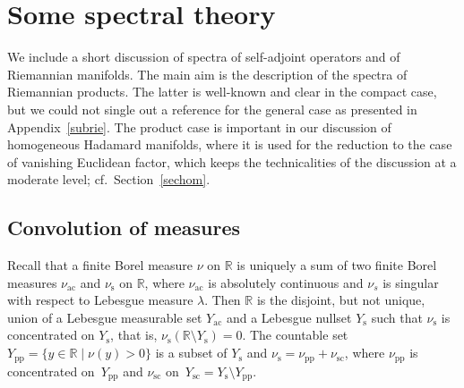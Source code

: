 \documentclass[pdftex]{sigma}
\numberwithin{equation}{section}
\def\p{\mathrm{pp}}
\def\ac{\mathrm{ac}}
\def\sc{\mathrm{sc}}
\def\s{\mathrm s}
\def\R{\mathbb R}
\begin{document}
\appendix

\section{Some spectral theory}\label{secspec}

We include a short discussion of spectra of self-adjoint operators and of Riemannian manifolds.
The main aim is the description of the spectra of Riemannian products.
The latter is well-known and clear in the compact case,
but we could not single out a reference for the general case as presented in Appendix~\ref{subrie}.
The product case is important in our discussion of homogeneous Hadamard manifolds,
where it is used for the reduction to the case of vanishing Euclidean factor,
which keeps the technicalities of the discussion at a moderate level; cf.\ Section~\ref{sechom}.

\subsection{Convolution of measures}%
Recall that a finite Borel measure $\nu$ on $\R$ is uniquely a sum of two finite Borel measures $\nu_{\ac}$ and $\nu_{\s}$ on $\R$,
where $\nu_{\ac}$ is absolutely continuous and $\nu_{s}$ is singular with respect to Lebesgue measure $\lambda$.
Then $\R$ is the disjoint, but not unique, union of a Lebesgue measurable set $Y_{\ac}$ and a Lebesgue nullset $Y_{\s}$ such that $\nu_{\s}$ is concentrated on $Y_{\s}$,
that is, $\nu_{\s}(\R\setminus Y_{\s})=0$.
The countable set $Y_{\p}=\{y\in\R\mid\nu(y)>0\}$ is a subset of $Y_{\s}$
and $\nu_{\s}=\nu_{\p}+\nu_{\sc}$,
where $\nu_{\p}$ is concentrated on~$Y_{\p}$ and $\nu_{\sc}$ on~$Y_{\sc}=Y_{\s}\setminus Y_{\p}$.
\end{document}
